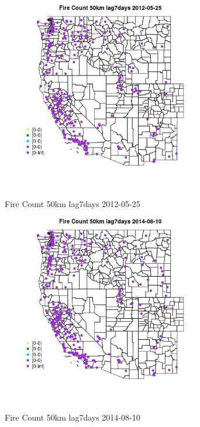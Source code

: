 \begin{figure} 
\centering  
\includegraphics[width=0.77\textwidth]{Code_Outputs/Report_ML_input_PM25_Step4_part_e_de_duplicated_aves_compiled_2019-05-18wNAs_MapObsFire_Count_50km_lag7days2012-05-25.jpg} 
\caption{\label{fig:Report_ML_input_PM25_Step4_part_e_de_duplicated_aves_compiled_2019-05-18wNAsMapObsFire_Count_50km_lag7days2012-05-25}Fire Count 50km lag7days 2012-05-25} 
\end{figure} 
 

\begin{figure} 
\centering  
\includegraphics[width=0.77\textwidth]{Code_Outputs/Report_ML_input_PM25_Step4_part_e_de_duplicated_aves_compiled_2019-05-18wNAs_MapObsFire_Count_50km_lag7days2014-08-10.jpg} 
\caption{\label{fig:Report_ML_input_PM25_Step4_part_e_de_duplicated_aves_compiled_2019-05-18wNAsMapObsFire_Count_50km_lag7days2014-08-10}Fire Count 50km lag7days 2014-08-10} 
\end{figure} 
 

